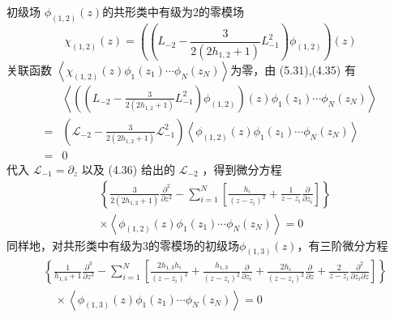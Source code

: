 初级场 $\phi_{(1,2)}(z) $的共形类中有级为2的零模场
\begin{equation}
	\chi_{(1,2)}(z)=\left(\left(L_{-2}-\frac{3}{2\left(2 h_{1,2}+1\right)} L_{-1}^{2}\right) \phi_{(1,2)}\right)(z)
\end{equation}
关联函数 $\left\langle\chi_{(1,2)}(z) \phi_{1}\left(z_{1}\right) \cdots \phi_{N}\left(z_{N}\right)\right\rangle $为零，由 (5.31),(4.35) 有
\begin{equation}
\begin{aligned} &\left\langle\left(\left(L_{-2}-\frac{3}{2\left(2 h_{1,2}+1\right)} L_{-1}^{2}\right) \phi_{(1,2)}\right)(z) \phi_{1}\left(z_{1}\right) \cdots \phi_{N}\left(z_{N}\right)\right\rangle \\ =&\left(\mathcal{L}_{-2}-\frac{3}{2\left(2 h_{1,2}+1\right)} \mathcal{L}_{-1}^{2}\right)\left\langle\phi_{(1,2)}(z) \phi_{1}\left(z_{1}\right) \cdots \phi_{N}\left(z_{N}\right)\right\rangle \\ =& 0 \end{aligned}
\end{equation}
代入 $\mathcal{L}_{-1}=\partial_{z}$ 以及 (4.36) 给出的 $\mathcal{L}_{-2}$ ，得到微分方程
\begin{equation}
	\begin{aligned} &\left\{\frac{3}{2\left(2 h_{1,2}+1\right)} \frac{\partial^{2}}{\partial z^{2}}-\sum_{i=1}^{N}\left[\frac{h_{i}}{\left(z-z_{i}\right)^{2}}+\frac{1}{z-z_{i}} \frac{\partial}{\partial z_{i}}\right]\right\} \\& \times\left\langle\phi_{(1,2)}(z) \phi_{1}\left(z_{1}\right) \cdots \phi_{N}\left(z_{N}\right)\right\rangle=0 \end{aligned}
\end{equation}
同样地，对共形类中有级为3的零模场的初级场$ \phi_{(1,3)}(z) $，有三阶微分方程
\begin{equation}
	\begin{aligned} &\left\{\frac{1}{ h_{1,3}+1} \frac{\partial^{3}}{\partial z^{3}}-\sum_{i=1}^{N}\left[\frac{2 h_{1,3} h_{i}}{\left(z-z_{i}\right)^{3}}+\frac{h_{1,3}}{\left(z-z_{i}\right)^{2}} \frac{\partial}{\partial z_{i}}+\frac{2 h_{i}}{\left(z-z_{i}\right)^{2}} \frac{\partial}{\partial z}+\frac{2}{z-z_{i}} \frac{\partial^{2}}{\partial z_{i} \partial z}\right]\right\} \\&\quad \times\left\langle\phi_{(1,3)}(z) \phi_{1}\left(z_{1}\right) \cdots \phi_{N}\left(z_{N}\right)\right\rangle=0 \end{aligned}
\end{equation}

